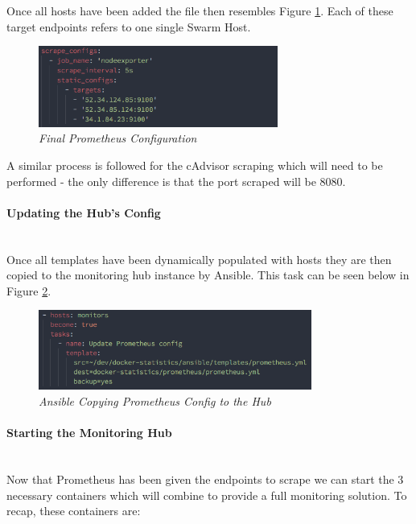 Once all hosts have been added the file then resembles Figure \ref{fig:prometheus-after}. Each of these target endpoints refers to one single Swarm Host.

\begin{figure}[!h]
\centering
\includegraphics*[width=0.7\textwidth]{components/images/prometheus-after}
\caption{\em Final Prometheus Configuration}
\label{fig:prometheus-after}
\end{figure}

A similar process is followed for the cAdvisor scraping which will need to be performed - the only difference is that the port scraped will be 8080. 

\paragraph{Updating the Hub's Config}\mbox{}\\

Once all templates have been dynamically populated with hosts they are then copied to the monitoring hub instance by Ansible. This task can be seen below in Figure \ref{fig:copy-prometheus}.

\begin{figure}[!h]
\centering
\includegraphics*[width=0.8\textwidth]{components/images/copy-prometheus}
\caption{\em Ansible Copying Prometheus Config to the Hub}
\label{fig:copy-prometheus}
\end{figure}

\paragraph{Starting the Monitoring Hub}\mbox{}\\

Now that Prometheus has been given the endpoints to scrape we can start the 3 necessary containers which will combine to provide a full monitoring solution. To recap, these containers are:

